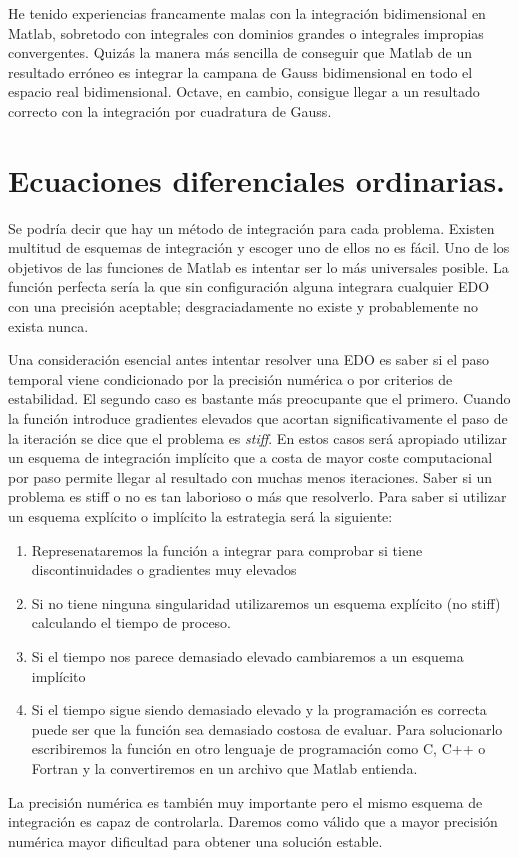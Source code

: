He tenido experiencias francamente malas con la integración
bidimensional en Matlab, sobretodo con integrales con dominios grandes
o integrales impropias convergentes.  Quizás la manera más sencilla de
conseguir que Matlab de un resultado erróneo es integrar la campana de
Gauss bidimensional en todo el espacio real bidimensional. Octave, en
cambio, consigue llegar a un resultado correcto con la integración por
cuadratura de Gauss.

\section{Ecuaciones diferenciales ordinarias.}

Se podría decir que hay un método de integración para cada problema.
Existen multitud de esquemas de integración y escoger uno de ellos
no es fácil. Uno de los objetivos de las funciones de Matlab es intentar
ser lo más universales posible. La función perfecta sería la que sin
configuración alguna integrara cualquier EDO con una precisión
aceptable; desgraciadamente no existe y probablemente no exista nunca.

Una consideración esencial antes intentar resolver una EDO es saber
si el paso temporal viene condicionado por la precisión numérica o
por criterios de estabilidad. El segundo caso es bastante más preocupante
que el primero. Cuando la función introduce gradientes elevados que
acortan significativamente el paso de la iteración se dice que el
problema es \emph{stiff}. En estos casos será apropiado
utilizar un esquema de integración implícito que a costa de mayor
coste computacional por paso permite llegar al resultado con muchas
menos iteraciones. Saber si un problema es stiff o no es tan laborioso
o más que resolverlo. Para saber si utilizar un esquema explícito
o implícito la estrategia será la siguiente:

\begin{enumerate}
\item Represenataremos la función a integrar para comprobar si tiene discontinuidades
o gradientes muy elevados
\item Si no tiene ninguna singularidad utilizaremos un esquema explícito
(no stiff) calculando el tiempo de proceso.
\item Si el tiempo nos parece demasiado elevado cambiaremos a un esquema
implícito
\item Si el tiempo sigue siendo demasiado elevado y la programación es correcta
puede ser que la función sea demasiado costosa de evaluar. Para solucionarlo
escribiremos la función en otro lenguaje de programación como C, C++
o Fortran y la convertiremos en un archivo que Matlab entienda.
\end{enumerate}
La precisión numérica es también muy importante pero el mismo esquema
de integración es capaz de controlarla. Daremos como válido que a
mayor precisión numérica mayor dificultad para obtener una solución
estable.

